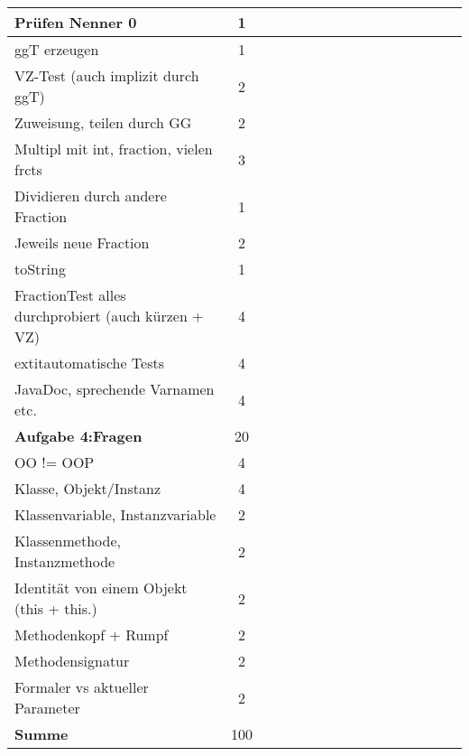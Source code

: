 \documentclass[a4paper, 10pt, landscape]{scrartcl}
\begin{document}
\begin{longtable}{|p{6cm}|c|c|c|c|c|c|c|c|c|c|c|c|c|c|p{8cm}|}
Prüfen Nenner 0& 1& & & & & & & & & & & & & & \\ \hline
ggT erzeugen& 1& & & & & & & & & & & & & & \\ \hline
VZ-Test (auch implizit durch ggT)& 2& & & & & & & & & & & & & & \\ \hline
Zuweisung, teilen durch GG & 2& & & & & & & & & & & & & & \\ \hline
Multipl mit int, fraction, vielen frcts& 3& & & & & & & & & & & & & & \\ \hline
Dividieren durch andere Fraction& 1& & & & & & & & & & & & & & \\ \hline
Jeweils neue Fraction& 2& & & & & & & & & & & & & & \\ \hline
toString& 1& & & & & & & & & & & & & & \\ \hline
FractionTest alles durchprobiert (auch kürzen + VZ)& 4& & & & & & & & & & & & & & \\ \hline
	extit{automatische Tests}& 4& & & & & & & & & & & & & & \\ \hline
JavaDoc, sprechende Varnamen etc.& 4& & & & & & & & & & & & & & \\ \hline
\rowcolor{gray!50}\textbf{Aufgabe 4:Fragen} & 20& & & & & & & & & & & & & & \\\hline\hline
OO != OOP& 4& & & & & & & & & & & & & & \\ \hline
Klasse, Objekt/Instanz& 4& & & & & & & & & & & & & & \\ \hline
Klassenvariable, Instanzvariable& 2& & & & & & & & & & & & & & \\ \hline
Klassenmethode, Instanzmethode& 2& & & & & & & & & & & & & & \\ \hline
Identität von einem Objekt (this + this.)& 2& & & & & & & & & & & & & & \\ \hline
Methodenkopf + Rumpf& 2& & & & & & & & & & & & & & \\ \hline
Methodensignatur& 2& & & & & & & & & & & & & & \\ \hline
Formaler vs aktueller Parameter& 2& & & & & & & & & & & & & & \\ \hline

\rowcolor{gray!10}\textbf{Summe} & 100 & & & & & & & & & & & & & & \\ \hline
\end{longtable}
\end{document}
